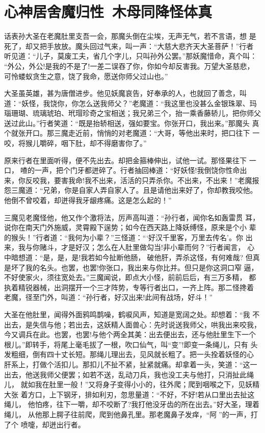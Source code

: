 \chapter{心神居舍魔归性~木母同降怪体真}

话表孙大圣在老魔肚里支吾一会，那魔头倒在尘埃，无声无气，若不言语，想
是死了，却又把手放放。魔头回过气来，叫一声：“大慈大悲齐天大圣菩萨！”行者
听见道：“儿子，莫废工夫，省几个字儿，只叫孙外公罢。”那妖魔惜命，真个叫：
“外公，外公!是我的不是了!一差二误吞了你，你如今却反害我。万望大圣慈悲，
可怜蝼蚁贪生之意，饶了我命，愿送你师父过山也。”

大圣虽英雄，甚为唐僧进步。他见妖魔哀告，好奉承的人，也就回了善念，叫
道：“妖怪，我饶你，你怎么送我师父？”老魔道：“我这里也没甚么金银珠翠、玛
瑙珊瑚、琉璃琥珀、玳瑁珍奇之宝相送；我兄弟三个，抬一乘香藤轿儿，把你师父
送过此山。”行者笑道：“既是抬轿相送，强如要宝。你张开口，我出来。”那魔头
真个就张开口。那三魔走近前，悄悄的对老魔道：“大哥，等他出来时，把口往下
一咬，将猴儿嚼碎，咽下肚，却不得磨害你了。”

原来行者在里面听得，便不先出去。却把金箍棒伸出，试他一试。那怪果往下
一口，喳的一声，把个门牙都迸碎了。行者抽回棒道：“好妖怪!我倒饶你性命出
来，你反咬我，要害我命!我不出来，活活的只弄杀你。不出来，不出来！”老魔报
怨三魔道：“兄弟，你是自家人弄自家人了。且是请他出来好了，你却教我咬他。
他倒不曾咬着，却迸得我牙龈疼痛。这是怎么起的！”

三魔见老魔怪他，他又作个激将法，厉声高叫道：“孙行者，闻你名如轰雷贯
耳，说你在南天门外施威，灵霄殿下逞势；如今在西天路上降妖缚怪，原来是个小
辈的猴头！”行者道：“我何为小辈？”三怪道：“‘好汉千里客，万里去传名’。你
出来，我与你赌斗，才是好汉；怎么在人肚里做勾当!非小辈而何？”行者闻言，
心中暗想道：“是，是，是!我若如今扯断他肠，破他肝，弄杀这怪，有何难哉?
但真是坏了我的名头。也罢，也罢!你张口，我出来与你比并。但只是你这洞口窄
逼，不好使家火，须往宽处去。”三魔闻说，即点大小怪，前前后后，有三万多精，
都执着精锐器械，出洞摆开一个三才阵势，专等行者出口，一齐上阵。那二怪搀着
老魔，径至门外，叫道：“孙行者，好汉出来!此间有战场，好斗！”

大圣在他肚里，闻得外面鸦鸣鹊噪，鹤唳风声，知道是宽阔之处。却想着：“我
不出去，是失信与他；若出去，这妖精人面兽心：先时说送我师父，哄我出来咬我，
今又调兵在此。也罢，也罢!与他个两全其美：出去便出去，还与他肚里生下一个
根儿。”即转手，将尾上毫毛拔了一根，吹口仙气，叫“变”!即变一条绳儿，只有
头发粗细，倒有四十丈长短。那绳儿理出去，见风就长粗了。把一头拴着妖怪的心
肝系上，打做个活扣儿。那扣儿不扯不紧，扯紧就痛。却拿着一头，笑道：“这一
出去，他送我师父便罢；如若不送，乱动刀兵，我也没工夫与他打，只消扯此绳儿，
就如我在肚里一般！”又将身子变得小小的，往外爬；爬到咽喉之下，见妖精大张
着方口，上下钢牙，排如利刃，忽思量道：“不好，不好!若从口里出去扯这绳儿，
他怕疼，往下一嚼，却不咬断了?我打他没牙齿的所在出去。”好大圣，理着绳儿，
从他那上腭子往前爬，爬到他鼻孔里。那老魔鼻子发痒，“阿”的一声，打了个
喷嚏，却迸出行者。

